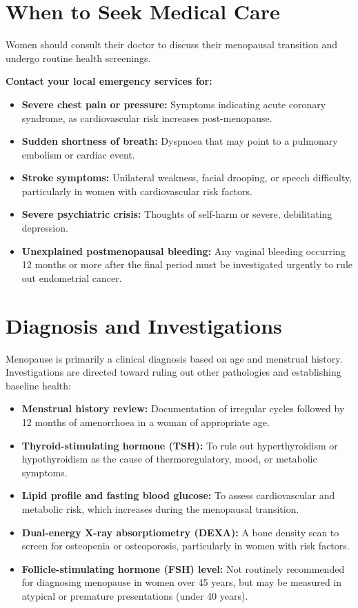 \section*{When to Seek Medical Care}
Women should consult their doctor to discuss their menopausal transition and undergo routine health screenings.

\textbf{Contact your local emergency services for:}
\begin{itemize}
    \item \textbf{Severe chest pain or pressure:} Symptoms indicating acute coronary syndrome, as cardiovascular risk increases post-menopause.
    \item \textbf{Sudden shortness of breath:} Dyspnoea that may point to a pulmonary embolism or cardiac event.
    \item \textbf{Stroke symptoms:} Unilateral weakness, facial drooping, or speech difficulty, particularly in women with cardiovascular risk factors.
    \item \textbf{Severe psychiatric crisis:} Thoughts of self-harm or severe, debilitating depression.
    \item \textbf{Unexplained postmenopausal bleeding:} Any vaginal bleeding occurring 12 months or more after the final period must be investigated urgently to rule out endometrial cancer.
\end{itemize}

\section*{Diagnosis and Investigations}
Menopause is primarily a clinical diagnosis based on age and menstrual history. Investigations are directed toward ruling out other pathologies and establishing baseline health:
\begin{itemize}
    \item \textbf{Menstrual history review:} Documentation of irregular cycles followed by 12 months of amenorrhoea in a woman of appropriate age.
    \item \textbf{Thyroid-stimulating hormone (TSH):} To rule out hyperthyroidism or hypothyroidism as the cause of thermoregulatory, mood, or metabolic symptoms.
    \item \textbf{Lipid profile and fasting blood glucose:} To assess cardiovascular and metabolic risk, which increases during the menopausal transition.
    \item \textbf{Dual-energy X-ray absorptiometry (DEXA):} A bone density scan to screen for osteopenia or osteoporosis, particularly in women with risk factors.
    \item \textbf{Follicle-stimulating hormone (FSH) level:} Not routinely recommended for diagnosing menopause in women over 45 years, but may be measured in atypical or premature presentations (under 40 years).
\end{itemize}

